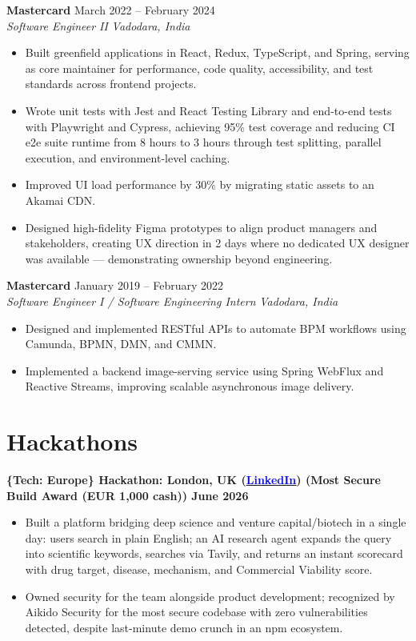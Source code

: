 \documentclass[a4paper,10pt]{article}
\let\oldhref\href
\renewcommand{\href}[2]{\oldhref{#1}{\uline{\textcolor{blue}{#2}}}}
\newcommand{\role}[4]{
  \textbf{\color{accent}#1} \hfill {\small #2}\\
  \textit{#3} \hfill {\small \textit{#4}}
}
\newcommand{\project}[1]{
  \textbf{\color{accent}#1}
}
\begin{document}
\role{Mastercard}{March 2022 -- February 2024}{Software Engineer II}{Vadodara, India}
\begin{itemize}
  \item Built greenfield applications in React, Redux, TypeScript, and Spring, serving as core maintainer for performance, code quality, accessibility, and test standards across frontend projects.
  \item Wrote unit tests with Jest and React Testing Library and end-to-end tests with Playwright and Cypress, achieving 95\% test coverage and reducing CI e2e suite runtime from 8 hours to 3 hours through test splitting, parallel execution, and environment-level caching.
  \item Improved UI load performance by 30\% by migrating static assets to an Akamai CDN.
  \item Designed high-fidelity Figma prototypes to align product managers and stakeholders, creating UX direction in 2 days where no dedicated UX designer was available --- demonstrating ownership beyond engineering.
\end{itemize}

\role{Mastercard}{January 2019 -- February 2022}{Software Engineer I / Software Engineering Intern}{Vadodara, India}
\begin{itemize}
  \item Designed and implemented RESTful APIs to automate BPM workflows using Camunda, BPMN, DMN, and CMMN.
  \item Implemented a backend image-serving service using Spring WebFlux and Reactive Streams, improving scalable asynchronous image delivery.
\end{itemize}

\section{Hackathons}

\project{\{Tech: Europe\} Hackathon: London, UK \small{(\href{https://www.linkedin.com/posts/aymanapatel_venturecapital-biotech-innovation-ugcPost-7476788869129072640-gef3}{LinkedIn})} \hfill (Most Secure Build Award (EUR 1,000 cash)) June 2026}{}
\begin{itemize}
  \item Built a platform bridging deep science and venture capital/biotech in a single day: users search in plain English; an AI research agent expands the query into scientific keywords, searches via Tavily, and returns an instant scorecard with drug target, disease, mechanism, and Commercial Viability score.
  \item Owned security for the team alongside product development; recognized by Aikido Security for the most secure codebase with zero vulnerabilities detected, despite last-minute demo crunch in an npm ecosystem.
\end{itemize}
\end{document}
